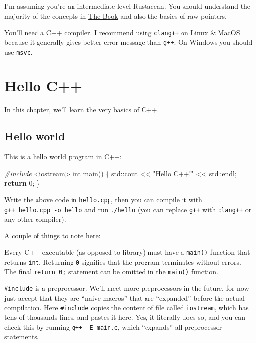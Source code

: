 \documentclass[
]{book}
\newenvironment{Shaded}{\begin{snugshade}}{\end{snugshade}}
\newcommand{\BuiltInTok}[1]{#1}
\newcommand{\ControlFlowTok}[1]{\textcolor[rgb]{0.13,0.29,0.53}{\textbf{#1}}}
\newcommand{\DataTypeTok}[1]{\textcolor[rgb]{0.13,0.29,0.53}{#1}}
\newcommand{\DecValTok}[1]{\textcolor[rgb]{0.00,0.00,0.81}{#1}}
\newcommand{\ImportTok}[1]{#1}
\newcommand{\NormalTok}[1]{#1}
\newcommand{\PreprocessorTok}[1]{\textcolor[rgb]{0.56,0.35,0.01}{\textit{#1}}}
\newcommand{\StringTok}[1]{\textcolor[rgb]{0.31,0.60,0.02}{#1}}
\begin{document}
I'm assuming you're an intermediate-level Rustacean. You should understand the majority of the concepts in \href{https://doc.rust-lang.org/book/}{The Book} and also the basics of raw pointers.

You'll need a C++ compiler. I recommend using \texttt{clang++} on Linux \& MacOS because it generally gives better error message than \texttt{g++}. On Windows you should use \texttt{msvc}.

\hypertarget{hello-c}{%
\chapter{Hello C++}\label{hello-c}}

In this chapter, we'll learn the very basics of C++.

\hypertarget{hello-world}{%
\section{Hello world}\label{hello-world}}

This is a hello world program in C++:

\begin{Shaded}
\begin{Highlighting}[]
\PreprocessorTok{\#include }\ImportTok{\textless{}iostream\textgreater{}}
\DataTypeTok{int}\NormalTok{ main()}
\NormalTok{\{}
    \BuiltInTok{std::}\NormalTok{cout \textless{}\textless{} }\StringTok{"Hello C++!"}\NormalTok{ \textless{}\textless{} }\BuiltInTok{std::}\NormalTok{endl;}
    \ControlFlowTok{return} \DecValTok{0}\NormalTok{;}
\NormalTok{\}}
\end{Highlighting}
\end{Shaded}

Write the above code in \texttt{hello.cpp}, then you can compile it with
\texttt{g++\ hello.cpp\ -o\ hello} and run \texttt{./hello} (you can replace \texttt{g++} with \texttt{clang++}
or any other compiler).

A couple of things to note here:

Every C++ executable (as opposed to library) must have a \texttt{main()} function that
returns \texttt{int}. Returning \texttt{0} signifies that the program terminates without errors.
The final \texttt{return\ 0;} statement can be omitted in the \texttt{main()} function.

\texttt{\#include} is a preprocessor. We'll meet more preprocessors in the future, for now
just accept that they are ``naive macros'' that are ``expanded'' before the actual
compilation.
Here \texttt{\#include} copies the content of file called \texttt{iostream}, which has tens of
thousands lines, and pastes it here. Yes, it literally does so, and you can check
this by running \texttt{g++\ -E\ main.c}, which ``expands'' all preprocessor statements.
\end{document}
